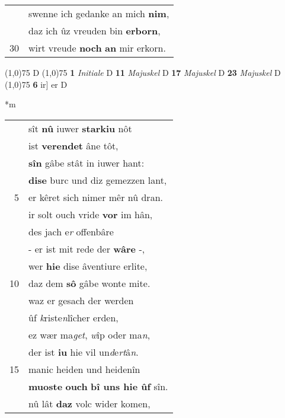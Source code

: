 \documentclass[8pt,a4paper,notitlepage]{article}
\begin{document}
\begin{table}[ht]
\begin{minipage}[t]{0.5\linewidth}
\begin{tabular}{rl}
 & swenne ich gedanke an mich \textbf{nim},\\ 
 & daz ich ûz vreuden bin \textbf{erborn},\\ 
30 & wirt vreude \textbf{noch} \textbf{an} mir erkorn.\\ 
\end{tabular}
\scriptsize
\line(1,0){75} \newline
D \newline
\line(1,0){75} \newline
\textbf{1} \textit{Initiale} D  \textbf{11} \textit{Majuskel} D  \textbf{17} \textit{Majuskel} D  \textbf{23} \textit{Majuskel} D  \newline
\line(1,0){75} \newline
\textbf{6} ir] er D \newline
\end{minipage}
\hspace{0.5cm}
\begin{minipage}[t]{0.5\linewidth}
\small
\begin{center}*m
\end{center}
\begin{tabular}{rl}
 & sît \textbf{nû} iuwer \textbf{starkiu} nôt\\ 
 & ist \textbf{verendet} âne tôt,\\ 
 & \textbf{sîn} gâbe stât in iuwer hant:\\ 
 & \textbf{dise} burc und diz gemezzen lant,\\ 
5 & er kêret sich nimer mêr nû dran.\\ 
 & ir solt ouch vride \textbf{vor} im hân,\\ 
 & des jach e\textit{r} offenbâre\\ 
 & - er ist mit rede der \textbf{wâre} -,\\ 
 & wer \textbf{hie} dise âventiure erlite,\\ 
10 & daz dem \textbf{sô} gâbe wonte mite.\\ 
 & waz er gesach der werden\\ 
 & ûf \textit{k}riste\textit{n}lîcher erden,\\ 
 & ez wær ma\textit{get}, \textit{w}îp oder ma\textit{n},\\ 
 & der ist \textbf{iu} hie vil un\textit{d}e\textit{rt}â\textit{n}.\\ 
15 & manic heiden und heidenîn\\ 
 & \textbf{muoste} \textbf{ouch} \textbf{bî uns hie ûf} sîn.\\ 
 & nû lât \textbf{daz} volc wider komen,\\ 

\end{tabular}
\end{minipage}
\end{table}
\end{document}
